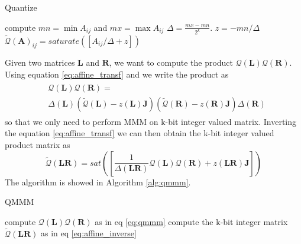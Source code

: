 \begin{algorithm}
	\caption{Quantize}\label{alg:quantize}
	\begin{algorithmic}[1]
		\State compute $mn = \min A_{ij}$ and $mx = \max A_{ij}$
		\State $\Delta = \frac{mx - mn}{2^k}$.
		\State $z = -mn/\Delta$
			\State $\tilde{\mathcal{Q}}(\mathbf{A})_{ij} = saturate([A_{ij}/\Delta + z ])$ 
		\EndFor
	\end{algorithmic}
\end{algorithm}

 Given two matrices $\mathbf{L}$ and $\mathbf{R}$, we want to compute the product $\mathcal{Q}(\mathbf{L}) \mathcal{Q}(\mathbf{R})$. Using equation \ref{eq:affine_transf} and we write the product as 
\begin{align}\label{eq:qmmm}
\begin{split}
& \mathcal{Q}(\mathbf{L}) \mathcal{Q}(\mathbf{R}) =\\
 & \Delta (\mathbf{L})\left( \tilde{\mathcal{Q}}(\mathbf{L}) - z(\mathbf{L})\mathbf{J} \right)
\left( \tilde{\mathcal{Q}}(\mathbf{R}) - z(\mathbf{R})\mathbf{J} \right)  \Delta (\mathbf{R})
\end{split}
\end{align}
so that we only need to perform MMM on k-bit integer valued matrix. Inverting the equation \ref{eq:affine_transf}  we can then obtain the k-bit integer valued product matrix as 
\begin{equation}\label{eq:affine_inverse}
\tilde{\mathcal{Q}}(\mathbf{LR}) = sat([\frac{1}{\Delta(\mathbf{LR})}\mathcal{Q}(\mathbf{L}) \mathcal{Q}(\mathbf{R}) + z(\mathbf{LR}) \mathbf{J}])
\end{equation} The algorithm is showed in Algorithm \ref{alg:qmmm}.

\begin{algorithm}
	\caption{QMMM}\label{alg:qmmm}
	\begin{algorithmic}[1]
		\State compute $\mathcal{Q}(\mathbf{L}) \mathcal{Q}(\mathbf{R})$ as in eq \ref{eq:qmmm}
		\State compute the k-bit integer matrix $\tilde{\mathcal{Q}}(\mathbf{LR})$ as in eq \ref{eq:affine_inverse}
 	\end{algorithmic}
\end{algorithm}

